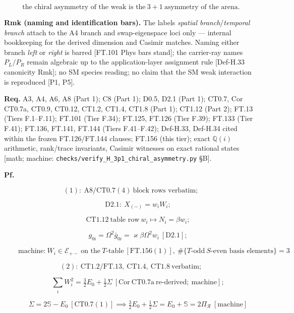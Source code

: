 \begin{theorem}
\[
\text{the chiral asymmetry of the weak is the}\ 3{+}1\ \text{asymmetry of the arena}.
\]

\textbf{Rmk (naming and identification bars).} The labels \textit{spatial branch}/\textit{temporal branch} attach to the A4 branch and swap-eigenspace loci only — internal bookkeeping for the derived dimension and Casimir matches. Naming either branch \textit{left} or \textit{right} is barred [FT.101 Phys bars stand]; the carrier-ray names $P_L/P_R$ remain algebraic up to the application-layer assignment rule [Def-H.33 canonicity Rmk]; no SM species reading; no claim that the SM weak interaction is reproduced [P1, P5].

\textbf{Req.} A3, A4, A6, A8 (Part 1); C8 (Part 1); D0.5, D2.1 (Part 1); CT0.7, Cor CT0.7a, CT0.9, CT0.12, CT1.2, CT1.4, CT1.8 (Part 1); CT1.12 (Part 2); FT.13 (Tiers F.1–F.11); FT.101 (Tier F.34); FT.125, FT.126 (Tier F.39); FT.133 (Tier F.41); FT.136, FT.141, FT.144 (Tiers F.41–F.42); Def-H.33, Def-H.34 cited within the frozen FT.126/FT.144 clauses; FT.156 (this tier); exact $\mathbb Q(i)$ arithmetic, rank/trace invariants, Casimir witnesses on exact rational states [math; machine: \texttt{checks/\allowbreak{}verify\_\allowbreak{}H\_\allowbreak{}3p1\_\allowbreak{}chiral\_\allowbreak{}asymmetry.py} §B].

\textbf{Pf.}

\[
(1):\ \mathrm{A8}/\mathrm{CT0.7}(4)\ \text{block rows verbatim};
\]

\[
\qquad \mathrm{D2.1}:\ X_{(-)}=w_iW_i;
\]

\[
\qquad \mathrm{CT1.12}\ \text{table row}\ w_i\mapsto N_i=\beta w_i;
\]

\[
\qquad g_{0i}=\Omega^2\bar g_{0i}=\varkappa\beta\Omega^2 w_i\ [\mathrm{D2.1}];
\]

\[
\qquad \text{machine:}\ W_i\in\mathcal E_{+-}\ \text{on the}\ T\text{-table}\ [\mathrm{FT.156}(1)],\ \#\{T\text{-odd}\ S\text{-even basis elements}\}=3
\]

\[
(2):\ \mathrm{CT1.2}/\mathrm{FT.13},\ \mathrm{CT1.4},\ \mathrm{CT1.8}\ \text{verbatim};
\]

\[
\qquad \textstyle\sum_iW_i^2=\tfrac32E_0+\tfrac12\Sigma\ [\mathrm{Cor}\ \mathrm{CT0.7a}\ \text{re-derived};\ \text{machine}];
\]

\[
\qquad \Sigma=2\mathbb S-E_0\ [\mathrm{CT0.7}(1)]\implies\tfrac32E_0+\tfrac12\Sigma=E_0+\mathbb S=2\Pi_{\mathcal R}\ [\text{machine}]
\]


\end{theorem}
